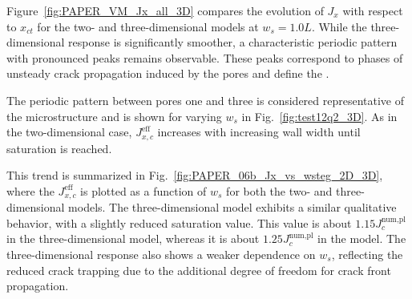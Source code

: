 \documentclass[pdflatex,sn-mathphys-num]{sn-jnl}%
\theoremstyle{thmstyleone}%
\theoremstyle{thmstyletwo}%
\theoremstyle{thmstylethree}%
\begin{document}
Figure~\ref{fig:PAPER_VM_Jx_all_3D} compares the evolution of $J_x$ with respect to $x_{ct}$ for the two- and three-dimensional models at $w_s=1.0L$. While the three-dimensional response is significantly smoother, a characteristic periodic pattern with pronounced peaks remains observable.  These peaks correspond to phases of unsteady crack propagation induced by the pores and define the . 

The periodic pattern between pores one and three
 is considered representative of the microstructure and is shown for varying $w_s$ in Fig.~\ref{fig:test12q2_3D}. As in the two-dimensional case, $J_{x,c}^{\text{eff}}$ increases with increasing wall width until saturation is reached.

This trend is summarized in Fig.~\ref{fig:PAPER_06b_Jx_vs_wsteg_2D_3D}, where the  $J_{x,c}^{\text{eff}}$ is plotted as a function of $w_s$ for both the two- and three-dimensional models. The three-dimensional model exhibits a similar qualitative behavior, with a slightly reduced saturation value. This value is about $1.15J_c^{\text{num,pl}}$ in the three-dimensional model, whereas it is about $1.25J_c^{\text{num,pl}}$ in the  model. The three-dimensional response also shows a weaker dependence on $w_s$, 
reflecting the reduced crack trapping due to the additional degree of freedom for crack front propagation.


\end{document}
